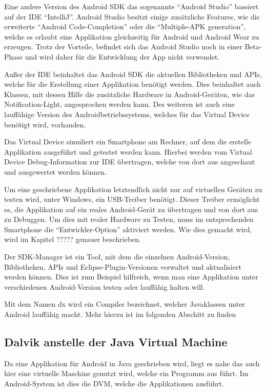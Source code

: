 Eine andere Version des Android \ac{SDK} das sogenannte "`Android Studio"' bassiert auf der \ac{IDE} "`IntelliJ"'. Android Studio besitzt einige zus\"atzliche Features, wie die erweiterte "`Android Code-Completion"' oder die "`Multiple-APK generation"', welche es erlaubt eine Applikation gleichzeitig f\"ur Android und Android Wear zu erzeugen. Trotz der Vorteile, befindet sich das Android Studio noch in einer Beta-Phase und wird daher f\"ur die Entwicklung der App nicht verwendet. \cite{DevAndroidStudio}

Au\ss{}er der \ac{IDE} beinhaltet das Android \ac{SDK} die aktuellen Bibliotheken und APIs, welche f\"ur die Erstellung einer Applikation ben\"otigt werden. Dies beinhaltet auch Klassen, mit dessen Hilfe die zus\"atzliche Hardware in Android-Ger\"aten, wie das Notification-Light, angesprochen werden kann. Des weiteren ist auch eine lauff\"ahige Version des Androidbetriebssystems, welches f\"ur das Virtual Device ben\"otigt wird, vorhanden.

Das Virtual Device simuliert ein Smartphone am Rechner, auf dem die erstelle Applikation ausgef\"uhrt und getestet werden kann. Hierbei werden vom Virtual Device Debug-Information zur \ac{IDE} \"ubertragen, welche von dort aus angeschaut und ausgewertet werden k\"onnen.

Um eine geschriebene Applikation letztendlich nicht nur auf virtuellen Ger\"aten zu testen wird, unter Windows, ein USB-Treiber ben\"otigt. Dieser Treiber erm\"oglicht es, die Applikation auf ein reales Android-Ger\"at zu \"ubertragen und von dort aus zu Debuggen.
Um dies mit realer Hardware zu Testen, muss im entsprechenden Smartphone die "`Entwickler-Option"' aktiviert werden. Wie dies gemacht wird, wird im Kapitel ????? genauer beschrieben.

Der SDK-Manager ist ein Tool, mit dem die einzelnen Android-Version, Bibliotheken, APIs und Eclipse-Plugin-Versionen verwaltet und aktualisiert werden k\"onnen. Dies ist zum Beispiel hilfreich, wenn man eine Applikation unter verschiedenen Android-Version testen oder lauff\"ahig halten will.

Mit dem Namen dx wird ein Compiler bezeichnet, welcher Javaklassen unter Android lauff\"ahig macht. Mehr hierzu ist im folgenden Abschitt zu finden

\subsection{Dalvik anstelle der Java Virtual Machine}
Da eine Applikation f\"ur Android in Java geschrieben wird, liegt es nahe das auch hier eine virtuelle Maschine genutzt wird, welche ein Programm aus f\"uhrt. Im Android-System ist dies die \ac{DVM}, welche die Applikationen ausf\"uhrt. \cite{Android44}

